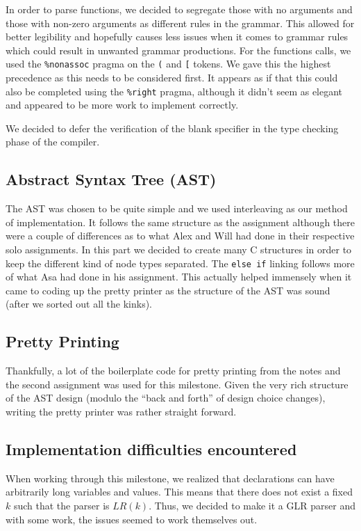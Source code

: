 \documentclass{article}
\begin{document}
In order to parse functions, we decided to segregate those with no arguments and
those with non-zero arguments as different rules in the grammar.
This allowed for better legibility and hopefully
causes less issues when it comes to grammar rules which could result in
unwanted grammar productions. For the functions calls, we used the
\verb|%nonassoc| pragma on the \verb|(| and \verb|[| tokens. We gave this the
highest precedence as this needs to be considered first.
It appears as if that this could also be completed using
the \verb|%right| pragma, although it didn't
seem as elegant and appeared to be more work to implement correctly.

We decided to defer the verification of the blank specifier in the type checking
phase of the compiler.


\subsection{Abstract Syntax Tree (AST)}

The AST was chosen to be quite simple and we used interleaving as our method
of implementation. It follows the same structure as the assignment although
there were a couple of differences as to what Alex and Will had done in their
respective solo assignments. In this part we decided to create many C structures
in order to keep the different kind of node types separated. The \verb|else if|
linking follows more of what Asa had done in his assignment. This actually helped
immensely when it came to coding up the pretty printer as the structure of
the AST was sound (after we sorted out all the kinks).

\subsection{Pretty Printing}

Thankfully, a lot of the boilerplate code for pretty printing from the notes
and the second assignment was used for this milestone. Given the very rich
structure of the AST design (modulo the ``back and forth'' of design choice
changes), writing the pretty printer was rather straight forward.

\subsection{Implementation difficulties encountered}

When working through this milestone, we realized that declarations can have
arbitrarily long variables and values. This means that there does not exist
a fixed $k$ such that the parser is $LR(k)$. Thus, we decided to make it a GLR
parser and with some work, the issues seemed to work themselves out.
\end{document}
